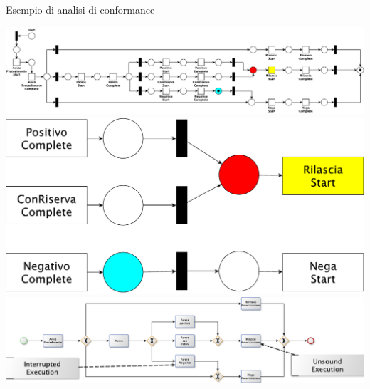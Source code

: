 \documentclass[10pt]{beamer}
\begin{document}
	
	\begin{frame}{}
	  Esempio di analisi di conformance
	  \begin{center}
	    \includegraphics[scale=0.50]{./fig/animazioneconf/ConfPNfinal}\\[10pt]
	    \includegraphics[scale=0.20]{./fig/animazioneconf/ConfPNz}\\[10pt]
	    \includegraphics[scale=0.50]{./fig/animazioneconf/BPMNConf}
	  \end{center}
	\end{frame}
	
\end{document}
